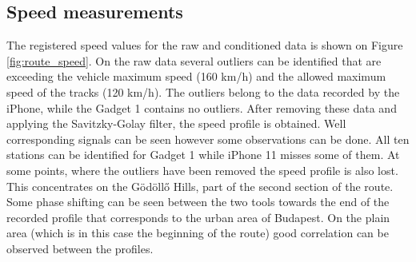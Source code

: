 \documentclass{article}
\begin{document}
		\subsection{Speed measurements}
			The registered speed values for the raw and conditioned data is shown on Figure \ref{fig:route_speed}. On the raw data several outliers can be identified that are exceeding the vehicle maximum speed (160 km/h) and the allowed maximum speed of the tracks (120 km/h). The outliers belong to the data recorded by the iPhone, while the Gadget 1 contains no outliers. After removing these data and applying the Savitzky-Golay filter, the speed profile is obtained. Well corresponding signals can be seen however some observations can be done. All ten stations can be identified for Gadget 1 while iPhone 11 misses some of them. At some points, where the outliers have been removed the speed profile is also lost. This concentrates on the Gödöllő Hills, part of the second section of the route. Some phase shifting can be seen between the two tools towards the end of the recorded profile that corresponds to the urban area of Budapest. On the plain area (which is in this case the beginning of the route) good correlation can be observed between the profiles.
\end{document}
